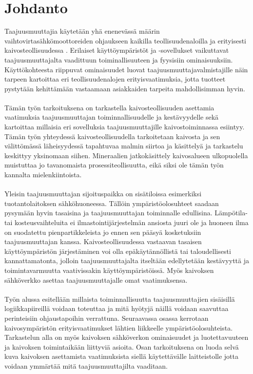 \documentclass[finnish,12pt,a4paper,pdftex,elec,utf8]{aaltothesis}
\begin{document}
\section{Johdanto}

\thispagestyle{empty}
Taajuusmuuttajia käytetään yhä enenevässä määrin vaihtovirtasähkömoottoreiden ohjaukseen kaikilla teollisuudenaloilla ja erityisesti kaivosteollisuudessa \cite[s. 262]{Hakapää}. %
Erilaiset käyttöympäristöt ja -sovellukset vaikuttavat taajuusmuuttajalta vaadittuun toiminallisuuteen ja fyysisiin ominaisuuksiin. Käyttökohteesta riippuvat ominaisuudet luovat taajuusmuuttajavalmistajille näin tarpeen kartoittaa eri teollisuudenalojen erityisvaatimuksia, jotta tuotteet pystytään kehittämään vastaamaan asiakkaiden tarpeita mahdollisimman hyvin. 
\\\\
Tämän työn tarkoituksena on tarkastella kaivosteollisuuden asettamia vaatimuksia taajuusmuuttajan toiminnallisuudelle ja kestävyydelle sekä kartoittaa millaisia eri sovelluksia taajuusmuuttajille kaivostoiminnassa esiintyy. Tämän työn yhteydessä kaivosteollisuudella tarkoitetaan kaivosta ja sen välittömässä läheisyydessä tapahtuvaa malmin siirtoa ja käsittelyä ja tarkastelu keskittyy yksinomaan siihen. Mineraalien jatkokäsittely kaivosalueen ulkopuolella muistuttaa jo tavanomaista prosessiteollisuutta, eikä siksi ole tämän työn kannalta mielenkiintoista.
\\\\
Yleisin taajuusmuuttajan sijoituspaikka on sisätiloissa esimerkiksi tuotantolaitoksen sähköhuoneessa. Tällöin ympäristöolosuhteet saadaan pysymään hyvin tasaisina ja taajuusmuuttajan toiminnalle edullisina. Lämpötila- tai kosteusvaihteluita ei ilmastointijärjestelmän ansiosta juuri ole ja huoneen ilma on suodatettu pienpartikkeleista jo ennen sen pääsyä kosketuksiin taajuusmuuttajan kanssa. Kaivosteollisuudessa vastaavan tasaisen käyttöympäristön järjestäminen voi olla epäkäytännöllistä tai taloudellisesti kannattamatonta, jolloin taajuusmuuttajalta itseltään edellytetään kestävyyttä ja toimintavarmuutta vaativissakin käyttöympäristöissä. Myös kaivoksen sähköverkko asettaa taajuusmuuttajalle omat vaatimuksensa.
\\\\
Työn alussa esitellään millaista toiminnallisuutta taajuusmuuttajien sisäisillä logiikkapiireillä voidaan toteuttaa ja mitä hyötyjä näillä voidaan saavuttaa perinteisiin ohjaustapoihin verrattuna. Seuraavassa osassa kerrotaan kaivosympäristön erityisvaatimukset lähtien liikkeelle ympäristöolosuhteista. Tarkastelun alla on myös kaivoksen sähköverkon ominaisuudet ja luotettavuuteen ja kaivoksen toimintaikään liittyviä asioita. Osan tarkoituksena on luoda selvä kuva kaivoksen asettamista vaatimuksista siellä käytettävälle laitteistolle jotta voidaan ymmärtää mitä taajuusmuuttajilta vaaditaan.
\end{document}
